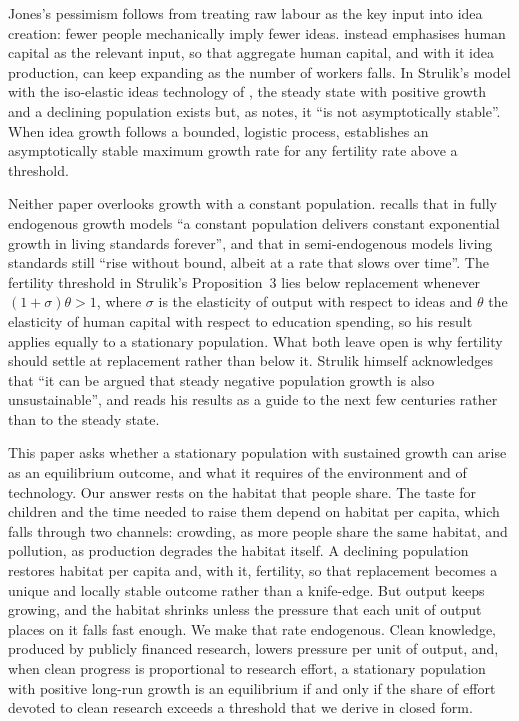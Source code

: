 \documentclass[11pt]{article}
\begin{document}
Jones's pessimism follows from treating raw labour as the key input into idea creation: fewer people
mechanically imply fewer ideas. \citet{STRULIK2024104943} instead emphasises human capital as the
relevant input, so that aggregate human capital, and with it idea production, can keep expanding as
the number of workers falls. In Strulik's model with the iso-elastic ideas technology of
\citet{jones22}, the steady state with positive growth and a declining population exists but, as
\citet[Section~2.5]{STRULIK2024104943} notes, it ``is not asymptotically stable''. When idea growth
follows a bounded, logistic process, \citet[Proposition~3]{STRULIK2024104943} establishes an
asymptotically stable maximum growth rate for any fertility rate above a threshold.

Neither paper overlooks growth with a constant population. \citet[pp.~3493--3494]{jones22} recalls that
in fully endogenous growth models ``a constant population delivers constant exponential growth in living
standards forever'', and that in semi-endogenous models living standards still ``rise without bound,
albeit at a rate that slows over time''. The fertility threshold in Strulik's Proposition~3 lies below
replacement whenever $(1+\sigma)\theta>1$, where $\sigma$ is the elasticity of output with respect to
ideas and $\theta$ the elasticity of human capital with respect to education spending, so his result
applies equally to a stationary population. What
both leave open is why fertility should settle at replacement rather than below it. Strulik himself
acknowledges that ``it can be argued that steady negative population growth is also unsustainable'', and
reads his results as a guide to the next few centuries rather than to the steady state.

This paper asks whether a stationary population with sustained growth can arise as an equilibrium
outcome, and what it requires of the environment and of technology. Our answer rests on the habitat
that people share. The taste for children and the time needed to raise them depend on habitat per
capita, which falls through two channels: crowding, as more people share the same habitat, and
pollution, as production degrades the habitat itself. A declining population restores habitat per
capita and, with it, fertility, so that replacement becomes a unique and locally stable outcome rather
than a knife-edge. But output keeps growing, and the habitat shrinks unless the pressure that each unit
of output places on it falls fast enough. We make that rate endogenous. Clean knowledge, produced by
publicly financed research, lowers pressure per unit of output, and, when clean progress is proportional
to research effort, a stationary population with positive long-run growth is an equilibrium if and only if
the share of effort devoted to clean research exceeds a threshold that we derive in closed form.
\end{document}
